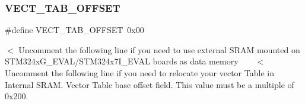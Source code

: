 \mbox{\label{group___s_t_m32_f4xx___system___private___defines_ga40e1495541cbb4acbe3f1819bd87a9fe}} 
\subsubsection{\texorpdfstring{V\+E\+C\+T\+\_\+\+T\+A\+B\+\_\+\+O\+F\+F\+S\+ET}{VECT\_TAB\_OFFSET}}
{\footnotesize\ttfamily \#define V\+E\+C\+T\+\_\+\+T\+A\+B\+\_\+\+O\+F\+F\+S\+ET~0x00}

$<$ Uncomment the following line if you need to use external S\+R\+AM mounted on S\+T\+M324x\+G\+\_\+\+E\+V\+A\+L/\+S\+T\+M324x7\+I\+\_\+\+E\+V\+AL boards as data memory ~\newline
~\newline
 $<$ Uncomment the following line if you need to relocate your vector Table in Internal S\+R\+AM. Vector Table base offset field. This value must be a multiple of 0x200. 